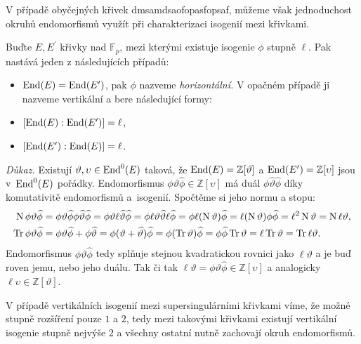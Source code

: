 \documentclass[12pt]{report}
\begin{document}
V případě obyčejných křivek dmsamdsaofopasfopsaf, můžeme však jednoduchost okruhů endomorfismů využít při charakterizaci isogenií mezi křivkami.

\begin{veta}
Buďte $E,E^\prime$ křivky nad $\mathbb{F}_p$, mezi kterými existuje isogenie $\phi$ stupně $\ell$. Pak nastává jeden z následujících případů:
\begin{itemize}
\item $\operatorname{End}(E) = \operatorname{End}(E^\prime)$, pak $\phi$ nazveme \textit{horizontální.} V opačném případě ji nazveme vertikální a bere následující formy:
\item $[\operatorname{End}(E) : \operatorname{End}(E^\prime)] = \ell$,
\item $[\operatorname{End}(E^\prime) : \operatorname{End}(E)] = \ell$.
\end{itemize}
\end{veta}
\noindent \textit{Důkaz.} Existují $\vartheta,\upsilon \in \operatorname{End}^0 (E)$ taková, že $\operatorname{End}(E) = \mathbb{Z}[\vartheta]$ a $\operatorname{End}(E^\prime) = \mathbb{Z}[\upsilon]$ jsou v~$\operatorname{End} ^0 (E)$ pořádky. Endomorfismus $\phi \vartheta \widehat{\phi} \in \mathbb{Z}[\upsilon]$ má duál $\phi \widehat{\vartheta} \widehat{\phi}$ díky komutativitě endomorfismů a~isogenií. Spočtěme si jeho normu a stopu:
\begin{align*}
\operatorname{N} \phi \vartheta \widehat{\phi} &= \phi \vartheta \widehat{\phi} \phi \widehat{\vartheta} \widehat{\phi} = \phi \vartheta \ell \widehat{\vartheta} \widehat{\phi} = \phi \ell \vartheta \widehat{\vartheta} \ell \widehat{\phi} = \phi \ell (\operatorname{N} \vartheta) \widehat{\phi} = \ell (\operatorname{N} \vartheta) \phi \widehat{\phi} = \ell ^2 \operatorname{N} \vartheta = \operatorname{N} \ell \vartheta,\\
\operatorname{Tr} \phi \vartheta \widehat{\phi} &= \phi \vartheta \widehat{\phi} + \phi \widehat{\vartheta} = \phi (\vartheta + \widehat{\vartheta}) \widehat{\phi} = \phi (\operatorname{Tr}  \vartheta) \widehat{\phi} = \phi \widehat{\phi} \operatorname{Tr} \vartheta = \ell \operatorname{Tr} \vartheta = \operatorname{Tr} \ell \vartheta.
 \end{align*}
 Endomorfismus $\phi \vartheta \widehat{\phi}$ tedy splňuje stejnou kvadratickou rovnici jako $\ell \vartheta$ a je buď roven jemu, nebo jeho duálu. Tak či tak $\ell \vartheta = \phi \vartheta \widehat{\phi} \in \mathbb{Z} [ \upsilon ]$ a analogicky $\ell \upsilon \in \mathbb{Z} [ \vartheta]$.

V případě vertikálních isogenií mezi supersingulárními křivkami víme, že možné stupně rozšíření pouze $1$ a $2$, tedy mezi takovými křivkami existují vertikální isogenie stupně nejvýše $2$ a všechny ostatní nutně zachovají okruh endomorfismů.
\end{document}
